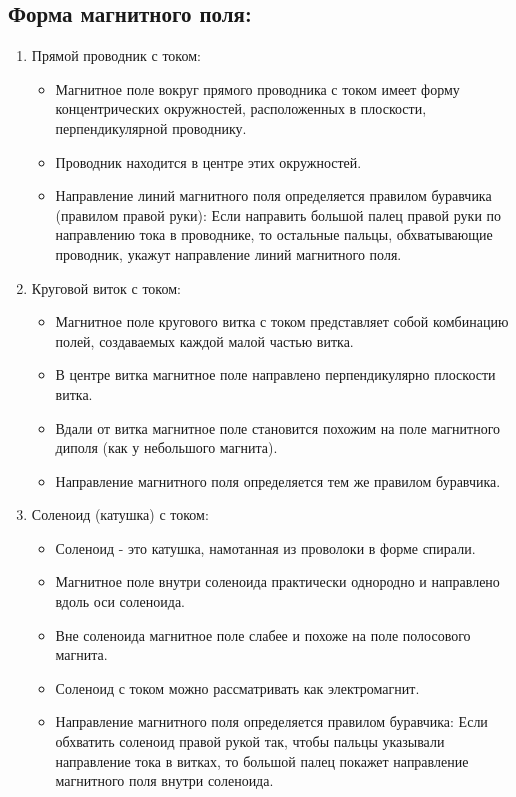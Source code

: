 \documentclass[a4paper,12pt]{article}
\begin{document}
\subsection*{Форма магнитного поля:}
\vspace{-3pt}
\begin{enumerate}[itemsep=0pt, topsep=0pt, parsep=3pt]
    \item Прямой проводник с током:
    \vspace{-0.05em}
    \begin{itemize}
        \item Магнитное поле вокруг прямого проводника с током имеет форму концентрических окружностей, расположенных в плоскости, перпендикулярной проводнику.
        \item Проводник находится в центре этих окружностей.
        \item Направление линий магнитного поля определяется правилом буравчика (правилом правой руки): Если направить большой палец правой руки по направлению тока в проводнике, то остальные пальцы, обхватывающие проводник, укажут направление линий магнитного поля.
    \end{itemize}
    \item Круговой виток с током:
    \vspace{-0.05em}
    \begin{itemize}
        \item Магнитное поле кругового витка с током представляет собой комбинацию полей, создаваемых каждой малой частью витка.
        \item В центре витка магнитное поле направлено перпендикулярно плоскости витка.
        \item Вдали от витка магнитное поле становится похожим на поле магнитного диполя (как у небольшого магнита).
        \item Направление магнитного поля определяется тем же правилом буравчика.
    \end{itemize}
    \newpage
    
    \item Соленоид (катушка) с током:
    \vspace{-0.05em}
    \begin{itemize}
        \item Соленоид - это катушка, намотанная из проволоки в форме спирали.
        \item Магнитное поле внутри соленоида практически однородно и направлено вдоль оси соленоида.
        \item Вне соленоида магнитное поле слабее и похоже на поле полосового магнита.
        \item Соленоид с током можно рассматривать как электромагнит.
        \item Направление магнитного поля определяется правилом буравчика: Если обхватить соленоид правой рукой так, чтобы пальцы указывали направление тока в витках, то большой палец покажет направление магнитного поля внутри соленоида.
    \end{itemize}
\end{enumerate}
\end{document}
